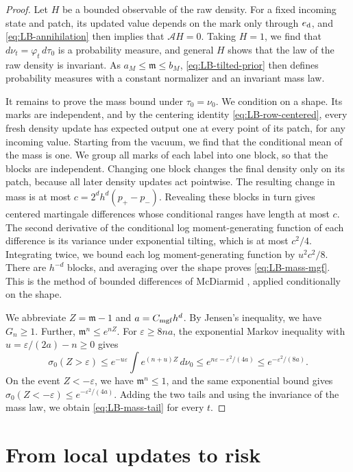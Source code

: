 \begin{proof}
Let $H$ be a bounded observable of the raw density. For a fixed incoming state and patch, its updated value depends on
the mark only through $e_{\rm d}$, and \eqref{eq:LB-annihilation} then implies
that $\mathcal AH=0$. Taking $H=1$, we find that
$d\nu_t=\varphi_t\,d\tau_0$ is a probability measure, and general $H$
shows that the law of the raw density is invariant. As
$a_M\le\mathfrak m\le b_M$, \eqref{eq:LB-tilted-prior} then defines
probability measures with a constant normalizer and an invariant mass
law.

It remains to prove the mass bound under $\tau_0=\nu_0$.
We condition on a shape. Its marks are independent, and by the
centering identity \eqref{eq:LB-row-centered}, every fresh density
update has expected output one at every point of its patch, for any
incoming value. Starting from the vacuum, we find that the conditional mean of
the mass is one. We group all marks of each label into one block, so that the
blocks are independent. Changing one block changes the final density
only on its patch, because all later density updates act pointwise. The
resulting change in mass is at most $c=2^dh^d(p_+-p_-)$. Revealing
these blocks in turn gives centered martingale differences whose
conditional ranges have length at most $c$. The second derivative of the
conditional log moment-generating function of each difference is its
variance under exponential tilting, which is at most $c^2/4$.
Integrating twice, we bound each log moment-generating function by
$u^2c^2/8$. There are $h^{-d}$ blocks, and averaging over the shape
proves \eqref{eq:LB-mass-mgf}. This is the method of bounded differences
of McDiarmid \cite[Lemma~5.8 and Theorem~6.7]{McDiarmid1989}, applied
conditionally on the shape.

We abbreviate $Z=\mathfrak m-1$ and $a=C_{\rm mgf}h^d$.
By Jensen's inequality, we have $G_n\ge1$. Further,
$\mathfrak m^n\le e^{nZ}$.
For $\varepsilon\ge8na$, the exponential Markov inequality with
$u=\varepsilon/(2a)-n\ge0$ gives
\[
 \sigma_0(Z>\varepsilon)
 \le e^{-u\varepsilon}\int e^{(n+u)Z}\,d\nu_0
 \le e^{n\varepsilon-\varepsilon^2/(4a)}
 \le e^{-\varepsilon^2/(8a)}.
\]
On the event $Z<-\varepsilon$, we have $\mathfrak m^n\le1$, and the
same exponential bound gives
$\sigma_0(Z<-\varepsilon)\le e^{-\varepsilon^2/(4a)}$. Adding the two
tails and using the invariance of the mass law, we obtain
\eqref{eq:LB-mass-tail} for every $t$.
\end{proof}
\section{From local updates to risk}\label{sec:LB-fisher}

